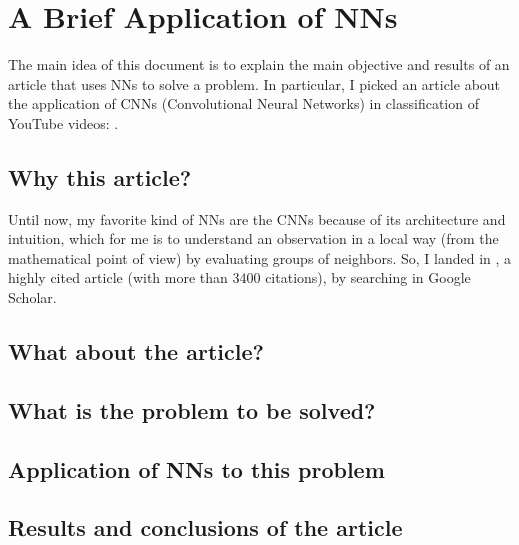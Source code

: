 \documentclass[12pt]{article}
\theoremstyle{plain}
\theoremstyle{definition}
\theoremstyle{definition}
\theoremstyle{definition}
\newtheorem*{solution}{Solución}
\begin{document}
\section*{A Brief Application of NNs}
\noindent The main idea of this document is to explain the main objective and results of an article that uses NNs to solve a problem. In particular, I picked an article about the application of CNNs  (Convolutional Neural Networks) in classification of YouTube videos: \cite{6909619}.     \subsection*{Why this article?}
\noindent Until now, my favorite kind of NNs are the CNNs because of its architecture and intuition, which for me is to understand an observation in a local way (from the mathematical point of view) by evaluating groups of neighbors. So, I landed in \cite{6909619}, a highly cited article (with more than $3400$ citations), by searching in Google Scholar.   
\subsection*{What about the article?}
\noindent
\subsection*{What is the problem to be solved?}
\noindent
\subsection*{Application of NNs to this problem}
\noindent
\subsection*{Results and conclusions of the article}
\noindent




   
\end{document}
